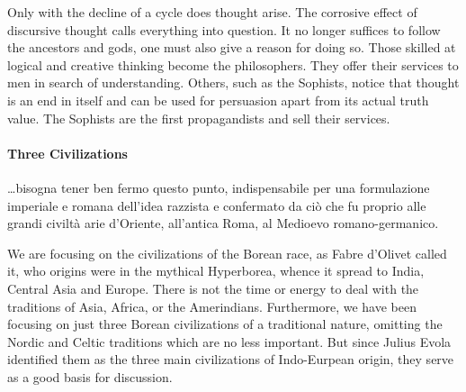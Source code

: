 Only with the decline of a cycle does thought arise. The corrosive effect of discursive thought calls everything into question. It no longer suffices to follow the ancestors and gods, one must also give a reason for doing so. Those skilled at logical and creative thinking become the philosophers. They offer their services to men in search of understanding. Others, such as the Sophists, notice that thought is an end in itself and can be used for persuasion apart from its actual truth value. The Sophists are the first propagandists and sell their services.

\paragraph{Three Civilizations}
\begin{quotex}
…bisogna tener ben fermo questo punto, indispensabile per una formulazione imperiale e romana dell'idea razzista e confermato da ciò che fu proprio alle grandi civiltà arie d'Oriente, all'antica Roma, al Medioevo romano-germanico.

\end{quotex}
We are focusing on the civilizations of the Borean race, as Fabre d'Olivet called it, who origins were in the mythical Hyperborea, whence it spread to India, Central Asia and Europe. There is not the time or energy to deal with the traditions of Asia, Africa, or the Amerindians. Furthermore, we have been focusing on just three Borean civilizations of a traditional nature, omitting the Nordic and Celtic traditions which are no less important. But since Julius Evola identified them as the three main civilizations of Indo-Eurpean origin, they serve as a good basis for discussion.

